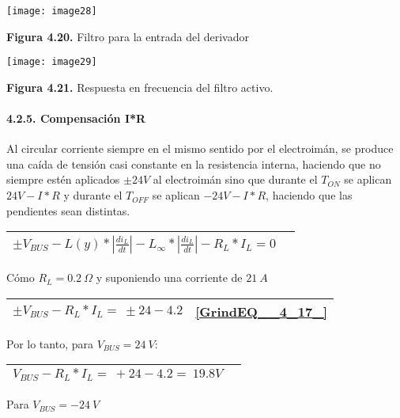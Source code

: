 \documentclass{article} %
\begin{document}
\noindent 

\noindent \texttt{[image: image28]}

\noindent \textbf{Figura 4.20. }Filtro para la entrada del derivador

\noindent 

\noindent \texttt{[image: image29]}

\noindent \textbf{Figura 4.21. }Respuesta en frecuencia del filtro activo.

\noindent 
\paragraph{4.2.5. Compensaci\'{o}n I*R}

\noindent Al circular corriente siempre en el mismo sentido por el electroim\'{a}n, se produce una ca\'{i}da de tensi\'{o}n casi constante en la resistencia interna, haciendo que no siempre est\'{e}n aplicados $\pm 24V$ al electroim\'{a}n sino que durante el $T_{ON}$ se aplican $24V-I*R$ y durante el $T_{OFF}$ se aplican $-24V-I*R$, haciendo que las pendientes sean distintas. 

\noindent 

\begin{tabular}{|p{3.9in}|p{0.4in}|} \hline 
$\pm V_{BUS}-L(y)*\left|\frac{{di}_L}{dt}\right|-L_{\infty }*\left|\frac{{di}_L}{dt}\right|-R_L*I_L=0$ &  \\ \hline 
\end{tabular}



\noindent C\'{o}mo  $R_L=0.2\ \mathit{\Omega}$ y suponiendo una corriente de $21\ A$  

\noindent 

\begin{tabular}{|p{3.9in}|p{0.5in}|} \hline 
$\pm V_{BUS}-R_L*I_L=\ \pm 24-4.2$ & \eqref{GrindEQ__4_17_}  \\ \hline 
\end{tabular}



\noindent Por lo tanto, para $V_{BUS}=24\ V$:

\begin{tabular}{|p{3.9in}|p{0.4in}|} \hline 
$V_{BUS}-R_L*I_L=\ +24-4.2=\ 19.8V$ &   \\ \hline 
\end{tabular}



\noindent Para $V_{BUS}=-24\ V$
\end{document}
